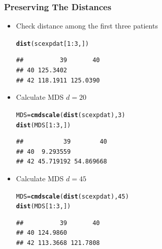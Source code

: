 \documentclass[xcolor=x11names,compress]{beamer}\usepackage[]{graphicx}\usepackage[]{color}
\makeatletter
\newcommand{\hlnum}[1]{\textcolor[rgb]{0.686,0.059,0.569}{#1}}%
\newcommand{\hlopt}[1]{\textcolor[rgb]{0,0,0}{#1}}%
\newcommand{\hlstd}[1]{\textcolor[rgb]{0.345,0.345,0.345}{#1}}%
\newcommand{\hlkwb}[1]{\textcolor[rgb]{0.69,0.353,0.396}{#1}}%
\newcommand{\hlkwd}[1]{\textcolor[rgb]{0.737,0.353,0.396}{\textbf{#1}}}%
\newenvironment{kframe}{%
 \def\at@end@of@kframe{}%
 \ifinner\ifhmode%
  \def\at@end@of@kframe{\end{minipage}}%
  \begin{minipage}{\columnwidth}%
 \fi\fi%
 \def\FrameCommand##1{\hskip\@totalleftmargin \hskip-\fboxsep
 \colorbox{shadecolor}{##1}\hskip-\fboxsep
     \hskip-\linewidth \hskip-\@totalleftmargin \hskip\columnwidth}%
 \MakeFramed {\advance\hsize-\width
   \@totalleftmargin\z@ \linewidth\hsize
   \@setminipage}}%
 {\par\unskip\endMakeFramed%
 \at@end@of@kframe}
\newenvironment{knitrout}{}{} %
\makeatother
\begin{document}
\begin{frame}[containsverbatim]
  \frametitle{Preserving The Distances}
\footnotesize
  \begin{itemize}
\item Check distance among the first three patients
\begin{knitrout}\tiny
{}\color{fgcolor}\begin{kframe}
\begin{alltt}
\hlkwd{dist}\hlstd{(scexpdat[}\hlnum{1}\hlopt{:}\hlnum{3}\hlstd{,])}
\end{alltt}
\begin{verbatim}
##          39       40
## 40 125.3402         
## 42 118.1911 125.0390
\end{verbatim}
\end{kframe}
\end{knitrout}
\item Calculate MDS $d=20$
\begin{knitrout}\tiny
{}\color{fgcolor}\begin{kframe}
\begin{alltt}
\hlstd{MDS}\hlkwb{=}\hlkwd{cmdscale}\hlstd{(}\hlkwd{dist}\hlstd{(scexpdat),}\hlnum{3}\hlstd{)}
\hlkwd{dist}\hlstd{(MDS[}\hlnum{1}\hlopt{:}\hlnum{3}\hlstd{,])}
\end{alltt}
\begin{verbatim}
##           39        40
## 40  9.293559          
## 42 45.719192 54.869668
\end{verbatim}
\end{kframe}
\end{knitrout}
\item Calculate MDS $d=45$
\begin{knitrout}\tiny
{}\color{fgcolor}\begin{kframe}
\begin{alltt}
\hlstd{MDS}\hlkwb{=}\hlkwd{cmdscale}\hlstd{(}\hlkwd{dist}\hlstd{(scexpdat),}\hlnum{45}\hlstd{)}
\hlkwd{dist}\hlstd{(MDS[}\hlnum{1}\hlopt{:}\hlnum{3}\hlstd{,])}
\end{alltt}
\begin{verbatim}
##          39       40
## 40 124.9860         
## 42 113.3668 121.7808
\end{verbatim}
\end{kframe}
\end{knitrout}

  \end{itemize}
\end{frame}
\end{document}
